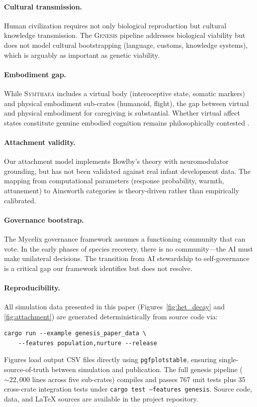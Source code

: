 \documentclass[11pt,letterpaper]{article}
\newcommand{\symthaea}{\textsc{Symthaea}}
\newcommand{\genesis}{\textsc{Genesis}}
\begin{document}
\paragraph{Cultural transmission.} Human civilization requires not only
biological reproduction but cultural knowledge transmission. The \genesis{}
pipeline addresses biological viability but does not model cultural
bootstrapping (language, customs, knowledge systems), which is arguably as
important as genetic viability.

\paragraph{Embodiment gap.} While \symthaea{} includes a virtual body
(interoceptive state, somatic markers) and physical embodiment sub-crates
(humanoid, flight), the gap between virtual and physical embodiment for
caregiving is substantial. Whether virtual affect states constitute genuine
embodied cognition remains philosophically contested
\cite{varela1991embodied,thompson2007mind}.

\paragraph{Attachment validity.} Our attachment model implements Bowlby's theory
\cite{bowlby1969attachment} with neuromodulator grounding, but has not been
validated against real infant development data. The mapping from computational
parameters (response probability, warmth, attunement) to Ainsworth categories
\cite{ainsworth1978patterns} is theory-driven rather than empirically calibrated.

\paragraph{Governance bootstrap.} The Mycelix governance framework assumes a
functioning community that can vote. In the early phases of species recovery,
there is no community---the AI must make unilateral decisions. The transition
from AI stewardship to self-governance is a critical gap our framework identifies
but does not resolve.

\paragraph{Reproducibility.} All simulation data presented in this paper
(Figures~\ref{fig:het_decay} and \ref{fig:attachment})
are generated deterministically from source code via:
\begin{verbatim}
cargo run --example genesis_paper_data \
    --features population,nurture --release
\end{verbatim}
Figures load output CSV files directly using \texttt{pgfplotstable}, ensuring
single-source-of-truth between simulation and publication. The full genesis
pipeline (${\sim}22{,}000$ lines across five sub-crates) compiles and passes
767 unit tests plus 35 cross-crate integration tests under
\texttt{cargo test --features genesis}. Source code, data, and \LaTeX{} sources
are available in the project repository.
\end{document}
